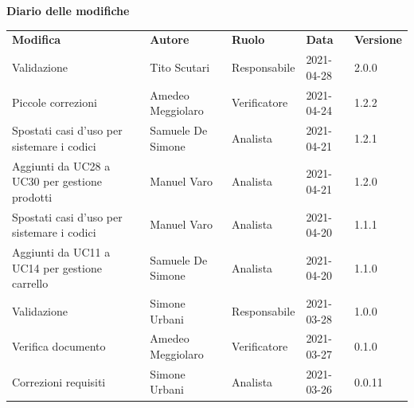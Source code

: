 \documentclass[a4paper]{article}
\begin{document}
\begin{center}
    \textbf{\Large Diario delle modifiche}\\
    \vspace{10px}
    \begin{table}[h!]
        \centering
        \renewcommand{\arraystretch}{1.8}
        \begin{tabular}{p{160px} p{90px} p{60px} p{60px} p{50px}}
            \rowcolor{logo!70} \textbf{Modifica}                 & \textbf{Autore}                            & \textbf{Ruolo}                 & \textbf{Data} & \textbf{Versione} \\
            Validazione                                          & Tito Scutari                               & Responsabile                   & 2021-04-28    & 2.0.0             \\
            Piccole correzioni                                   & Amedeo Meggiolaro                          & Verificatore                   & 2021-04-24    & 1.2.2             \\
            Spostati casi d'uso per sistemare i codici           & Samuele De Simone                          & Analista                       & 2021-04-21    & 1.2.1             \\
            Aggiunti da UC28 a UC30 per gestione prodotti        & Manuel Varo                                & Analista                       & 2021-04-21    & 1.2.0             \\
            Spostati casi d'uso per sistemare i codici           & Manuel Varo                                & Analista                       & 2021-04-20    & 1.1.1             \\
            Aggiunti da UC11 a UC14 per gestione carrello        & Samuele De Simone                          & Analista                       & 2021-04-20    & 1.1.0             \\
            Validazione                                          & Simone Urbani                              & Responsabile                   & 2021-03-28    & 1.0.0             \\
            Verifica documento                                   & Amedeo Meggiolaro                          & Verificatore                   & 2021-03-27    & 0.1.0             \\
            Correzioni requisiti                                 & Simone Urbani                              & Analista                       & 2021-03-26    & 0.0.11            \\

\end{tabular}
\end{table}
\end{center}
\end{document}
